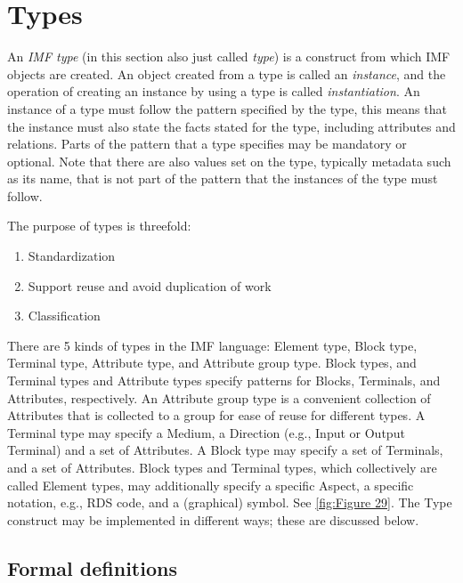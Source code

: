 \section{Types}
An \emph{IMF type} (in this section also just called \emph{type}) is a construct from
which IMF objects are created. An object created from a type is called an \emph{instance}, and the operation of
creating an instance by using a type is called \emph{instantiation}. An instance of a type must follow the pattern
specified by the type, this means that the instance must also state the facts stated for the type, including
attributes and relations. Parts of the pattern that a type specifies may be mandatory or optional. Note that there
are also values set on the type, typically metadata such as its name, that is not part of the pattern that the
instances of the type must follow.

The purpose of types is threefold:

\begin{enumerate}
  \item Standardization
  \item Support reuse and avoid duplication of work
  \item Classification
\end{enumerate}
There are 5 kinds of types in the IMF language: Element type, Block type, Terminal type, Attribute type, and Attribute
group type. Block types, and Terminal types and Attribute types specify patterns for Blocks, Terminals, and
Attributes, respectively. An Attribute group type is a convenient collection of Attributes that is collected to a
group for ease of reuse for different types. A Terminal type may specify a Medium, a Direction (e.g., Input or Output
Terminal) and a set of Attributes. A Block type may specify a set of Terminals, and a set of Attributes. Block types
and Terminal types, which collectively are called Element types, may additionally specify a specific Aspect, a
specific notation, e.g., RDS code, and a (graphical) symbol. See \autoref{fig:Figure 29}. The Type construct may be implemented in
different ways; these are discussed below.

\subsection{Formal definitions}

